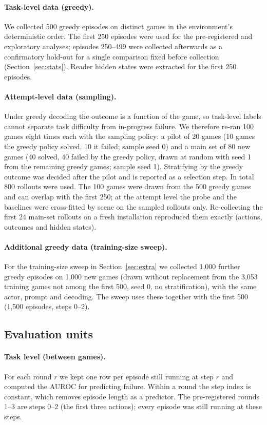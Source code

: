 \documentclass[11pt]{article}
\begin{document}
\paragraph{Task-level data (greedy).} We collected 500 greedy episodes on distinct games in the environment's deterministic order.
The first 250 episodes were used for the pre-registered and exploratory analyses; episodes 250--499 were collected afterwards as a confirmatory hold-out
for a single comparison fixed before collection (Section~\ref{sec:stats}). Reader hidden states were extracted for the first 250 episodes.

\paragraph{Attempt-level data (sampling).} Under greedy decoding the outcome is a function of the game, so task-level labels cannot separate task difficulty from in-progress failure.
We therefore re-ran 100 games eight times each with the sampling policy: a pilot of 20 games (10 games the greedy policy solved, 10 it failed; sample seed 0)
and a main set of 80 new games (40 solved, 40 failed by the greedy policy, drawn at random with seed 1 from the remaining greedy games; sample seed 1).
Stratifying by the greedy outcome was decided after the pilot and is reported as a selection step. In total 800 rollouts were used. The 100 games were drawn from the 500 greedy games and can overlap with the first 250; at the attempt level the probe and the baselines were cross-fitted by scene on the sampled rollouts only.
Re-collecting the first 24 main-set rollouts on a fresh installation reproduced them exactly (actions, outcomes and hidden states).

\paragraph{Additional greedy data (training-size sweep).} For the training-size sweep in Section~\ref{sec:extra} we collected 1,000 further greedy episodes on 1,000 new games (drawn without replacement from the 3,053 training games not among the first 500, seed 0, no stratification), with the same actor, prompt and decoding. The sweep uses these together with the first 500 (1,500 episodes, steps 0--2).

\subsection{Evaluation units}
\paragraph{Task level (between games).} For each round $r$ we kept one row per episode still running at step $r$ and computed the AUROC for predicting failure.
Within a round the step index is constant, which removes episode length as a predictor. The pre-registered rounds 1--3 are steps 0--2 (the first three actions);
every episode was still running at these steps.
\end{document}

